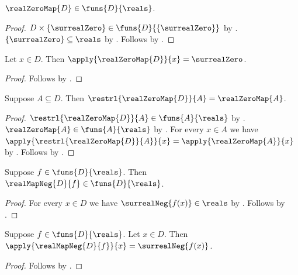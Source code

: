 \begin{proposition}\label{real_zero_map_type}
    $\realZeroMap{D}\in\funs{D}{\reals}$.
\end{proposition}
\begin{proof}
    $D\times\{\surrealZero\}\in\funs{D}{\{\surrealZero\}}$
        by .
    $\{\surrealZero\}\subseteq\reals$
        by .
    Follows by .
\end{proof}

\begin{proposition}\label{real_zero_map_apply}
    Let $x\in D$.
    Then $\apply{\realZeroMap{D}}{x}=\surrealZero$.
\end{proposition}
\begin{proof}
    Follows by .
\end{proof}

\begin{proposition}\label{real_zero_map_restrl}
    Suppose $A\subseteq D$.
    Then $\restrl{\realZeroMap{D}}{A}=\realZeroMap{A}$.
\end{proposition}
\begin{proof}
    $\restrl{\realZeroMap{D}}{A}\in\funs{A}{\reals}$
        by .
    $\realZeroMap{A}\in\funs{A}{\reals}$
        by .
    For every $x\in A$ we have
        $\apply{\restrl{\realZeroMap{D}}{A}}{x}
            =\apply{\realZeroMap{A}}{x}$
        by
        .
    Follows by .
\end{proof}

\begin{proposition}\label{real_map_neg_type}
    Suppose $f\in\funs{D}{\reals}$.
    Then $\realMapNeg{D}{f}\in\funs{D}{\reals}$.
\end{proposition}
\begin{proof}
    For every $x\in D$ we have $\surrealNeg{f(x)}\in\reals$
        by .
    Follows by
        .
\end{proof}

\begin{proposition}\label{real_map_neg_apply}
    Suppose $f\in\funs{D}{\reals}$.
    Let $x\in D$.
    Then $\apply{\realMapNeg{D}{f}}{x}=\surrealNeg{f(x)}$.
\end{proposition}
\begin{proof}
    Follows by
        .
\end{proof}

